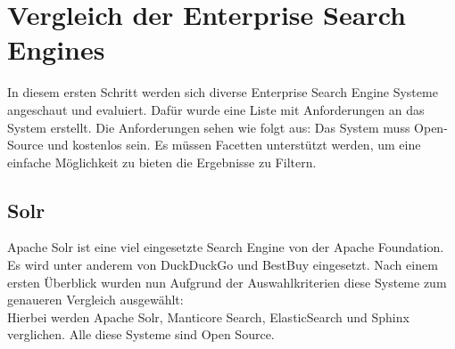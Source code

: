 \chapter{Vergleich der Enterprise Search Engines}

In diesem ersten Schritt werden sich diverse Enterprise Search Engine Systeme angeschaut und evaluiert. Dafür wurde eine Liste mit Anforderungen an das System erstellt. Die Anforderungen sehen wie folgt aus:
Das System muss Open-Source und kostenlos sein. Es müssen Facetten unterstützt werden, um eine einfache Möglichkeit zu bieten die Ergebnisse zu Filtern.

\section{Solr}

Apache Solr ist eine viel eingesetzte Search Engine von der Apache Foundation. Es wird unter anderem von DuckDuckGo und BestBuy eingesetzt. Nach einem ersten Überblick wurden nun Aufgrund der Auswahlkriterien diese Systeme zum genaueren Vergleich ausgewählt: \\


Hierbei werden Apache Solr, Manticore Search, ElasticSearch und Sphinx verglichen. Alle diese Systeme sind Open Source. 

